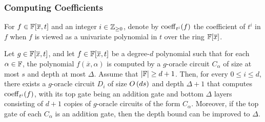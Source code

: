 \documentclass[letterpaper, 11pt]{amsart}
\newif\iffull
\begin{document}
\subsubsection{Computing Coefficients}

\begin{defn}\label{defn:coeff}
  For $f \in \mathbb{F}[\overline{x}, t]$ and an integer $i \in \mathbb{Z}_{\geq 0}$, denote by $\operatorname{coeff}_{t^i}(f)$ the coefficient of $t^i$ in $f$ when $f$ is viewed as a univariate polynomial in $t$ over the ring $\mathbb{F}[\overline{x}]$.
\end{defn}

\begin{lem}[{\cite[Lemma 2.29]{DG25}}]\label{lem:homogenization}
  Let $g \in \mathbb{F}[\overline{x},t]$, and let $f \in \mathbb{F}[\overline{x},t]$ be a degree-$d$ polynomial such that for each $\alpha \in \mathbb{F}$, the polynomial $f(\overline{x},\alpha)$ is computed by a $g$-oracle circuit $C_\alpha$ of size at most $s$ and depth at most $\Delta$.
  Assume that $\abs{\mathbb{F}} \geq d + 1$.
  Then, for every $0 \leq i \leq d$, there exists a $g$-oracle circuit $D_i$ of size $O\kern-0.0pt\left(ds\right)$ and depth $\Delta+1$ that computes $\operatorname{coeff}_{t^i}(f)$, with its top gate being an addition gate and bottom $\Delta$ layers consisting of $d+1$ copies of $g$-oracle circuits of the form $C_\alpha$.
  Moreover, if the top gate of each $C_\alpha$ is an addition gate, then the depth bound can be improved to $\Delta$.
\end{lem}
\iffull
\end{document}
